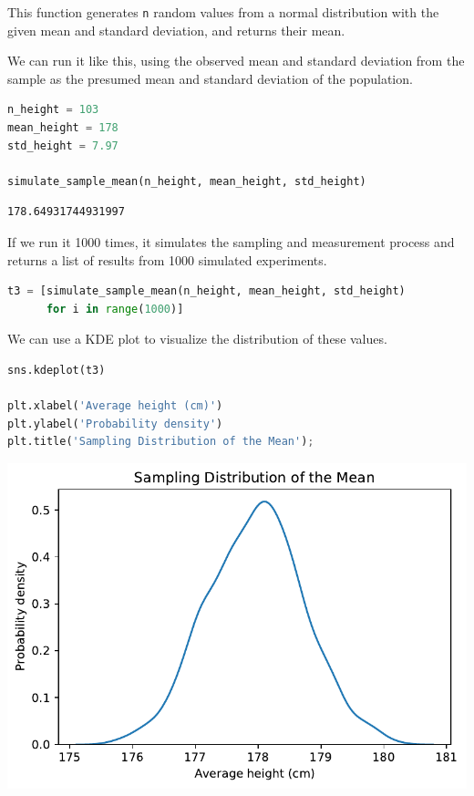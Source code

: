 This function generates \passthrough{\lstinline!n!} random values from a
normal distribution with the given mean and standard deviation, and
returns their mean.

We can run it like this, using the observed mean and standard deviation
from the sample as the presumed mean and standard deviation of the
population.

\begin{lstlisting}[language=Python,style=source]
n_height = 103
mean_height = 178
std_height = 7.97

simulate_sample_mean(n_height, mean_height, std_height)
\end{lstlisting}

\begin{lstlisting}[style=output]
178.64931744931997
\end{lstlisting}

If we run it 1000 times, it simulates the sampling and measurement
process and returns a list of results from 1000 simulated experiments.

\begin{lstlisting}[language=Python,style=source]
t3 = [simulate_sample_mean(n_height, mean_height, std_height)
      for i in range(1000)]
\end{lstlisting}

We can use a KDE plot to visualize the distribution of these values.

\begin{lstlisting}[language=Python,style=source]
sns.kdeplot(t3)

plt.xlabel('Average height (cm)')
plt.ylabel('Probability density')
plt.title('Sampling Distribution of the Mean');
\end{lstlisting}

\begin{center}
\includegraphics[scale=0.75]{11_resampling_files/11_resampling_60_0.pdf}
\end{center}


